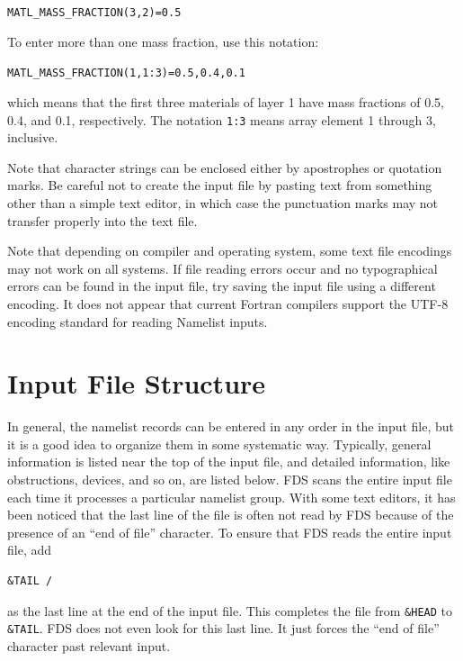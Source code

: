 \documentclass[11pt]{book}
\newcommand{\ct}{\tt\small}
\begin{document}
{\ct MATL\_MASS\_FRACTION(3,2)=0.5}

\noindent
To enter more than one mass fraction, use
this notation:

{\ct MATL\_MASS\_FRACTION(1,1:3)=0.5,0.4,0.1}

\noindent
which means that the first three materials of layer 1 have
mass fractions of 0.5, 0.4, and 0.1, respectively. The notation {\ct 1:3} means array element 1 through 3, inclusive.



\begin{warning}
\noindent
Note that character strings can be enclosed either by apostrophes or quotation marks.
Be careful not to create the input file by pasting text from something other than a
simple text editor, in which case the punctuation marks may not transfer
properly into the text file.
\end{warning}

\begin{warning}
\noindent
Note that depending on compiler and operating system, some text file encodings may not work on all systems.
If file reading errors occur and no typographical errors can be found in the input file, try saving the input file using a different encoding.
It does not appear that current Fortran compilers support the UTF-8 encoding standard for reading Namelist inputs.
\end{warning}



\section{Input File Structure}

In general, the namelist records can be entered in any order in the input file, but it is a good idea to organize them
in some systematic way. Typically, general information is listed near the top of the input file, and detailed information, like
obstructions, devices, and so on, are listed below. FDS scans the entire input file each time it processes a particular namelist group.
With some text editors, it has been noticed that the last line of the file is often not read by FDS because of the presence of an
``end of file'' character.
To ensure that FDS reads the entire input file, add

\footnotesize
\begin{verbatim}
&TAIL /
\end{verbatim}
\normalsize \noindent
as the last line at the end of the input file. This completes the file from {\ct \&HEAD} to {\ct \&TAIL}. FDS does not even look for
this last line. It just forces the ``end of file'' character past relevant input.
\end{document}
